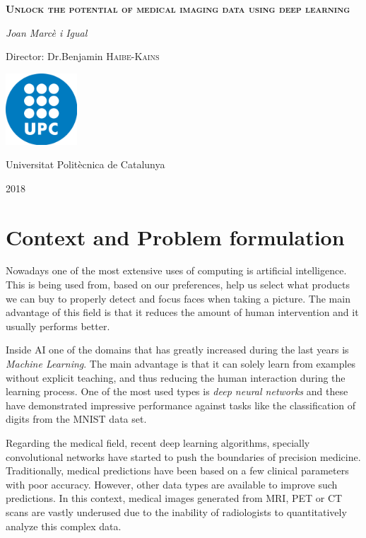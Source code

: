 \documentclass[a4paper, 12pt]{article}
\begin{document}
\begin{titlepage}
    \centering
	\vspace{1.5cm}
	{\huge \textbf{\textsc{Unlock the potential of medical imaging data using deep learning}} \par}
	\vspace{2cm}
	{\Large \textit{Joan Marcè i Igual}\par}
	\vfill
    Director: Dr.Benjamin \textsc{Haibe-Kains}
    
    \vfill

    \includegraphics[width=0.2\textwidth]{images/logo_upc}\par\vspace{1cm}
	\vfill
    
    {\LARGE Universitat Politècnica de Catalunya \par}
    {\LARGE 2018 \par}
\end{titlepage}

\tableofcontents

\pagebreak
\section{Context and Problem formulation}

Nowadays one of the most extensive uses of computing is artificial intelligence. This is being
used from, based on our preferences, help us select what products we can buy to properly detect
and focus faces when taking a picture. The main advantage of this field is that it reduces the
amount of human intervention and it usually performs better.

Inside AI one of the domains that has greatly increased during the last years is 
\emph{Machine Learning}. The main advantage is that it can solely learn from examples without 
explicit teaching, and thus reducing the human interaction during the learning process. One of the 
most used types is \emph{deep neural networks} and these have demonstrated impressive performance 
against tasks like the classification of digits from the MNIST data set.
~\cites{MNIST}{empirical-evaluation-deep-architectures}

Regarding the medical field, recent deep learning algorithms, specially convolutional networks 
have started to push the boundaries of precision medicine. 
Traditionally, medical predictions have been based on a few clinical parameters with poor accuracy.
However, other data types are available to improve such predictions. In this context, medical
images generated from MRI, PET or CT scans are vastly underused due to the inability of radiologists
to quantitatively analyze this complex data.
\end{document}

